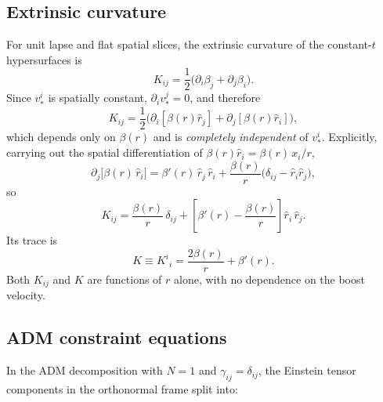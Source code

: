 \documentclass[11pt]{article}
\begin{document}
\subsection{Extrinsic curvature}
For unit lapse and flat spatial slices, the extrinsic curvature of the constant-$t$ hypersurfaces is
\begin{equation}
K_{ij} = \frac{1}{2}\bigl(\partial_i \beta_j + \partial_j \beta_i\bigr).
\end{equation}
Since $v_*^i$ is spatially constant, $\partial_i v_*^j = 0$, and therefore
\begin{equation}
\label{eq:app-Kij-invariance}
K_{ij} = \frac{1}{2}\bigl(\partial_i [\beta(r)\hat r_j] + \partial_j [\beta(r)\hat r_i]\bigr),
\end{equation}
which depends only on $\beta(r)$ and is \emph{completely independent} of $v_*^i$. Explicitly, carrying out the spatial differentiation of $\beta(r)\hat r_i = \beta(r)\,x_i/r$,
\begin{equation}
\partial_j\bigl[\beta(r)\,\hat r_i\bigr] = \beta'(r)\,\hat r_j\,\hat r_i + \frac{\beta(r)}{r}\bigl(\delta_{ij} - \hat r_i \hat r_j\bigr),
\end{equation}
so
\begin{equation}
\label{eq:app-Kij-explicit}
K_{ij} = \frac{\beta(r)}{r}\,\delta_{ij} + \left[\beta'(r) - \frac{\beta(r)}{r}\right]\hat r_i\,\hat r_j.
\end{equation}
Its trace is
\begin{equation}
\label{eq:app-K-trace}
K \equiv K^i{}_i = \frac{2\beta(r)}{r} + \beta'(r).
\end{equation}
Both $K_{ij}$ and $K$ are functions of $r$ alone, with no dependence on the boost velocity.

\subsection{ADM constraint equations}

In the ADM decomposition with $N=1$ and $\gamma_{ij}=\delta_{ij}$, the Einstein tensor components in the orthonormal frame split into:
\end{document}

